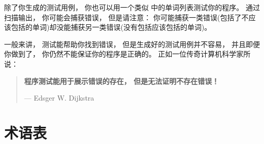 
除了你生成的测试用例， 你也可以用一个类似  中的单词列表测试你的程序。   通过扫描输出， 你可能会捕获错误， 但是请注意：
你可能捕获一类错误(包括了不应该包括的单词)却没能捕获另一类错误(没有包括应该包括的单词)。



一般来讲， 测试能帮助你找到错误， 但是生成好的测试用例并不容易，
并且即便你做到了， 你仍然不能保证你的程序是正确的。  正如一位传奇计算机科学家所说：
\begin{quote}
{\bf 程序测试能用于展示错误的存在， 但是无法证明不存在错误！}

--- Edsger W. Dijkstra
\end{quote}


\section{术语表}

